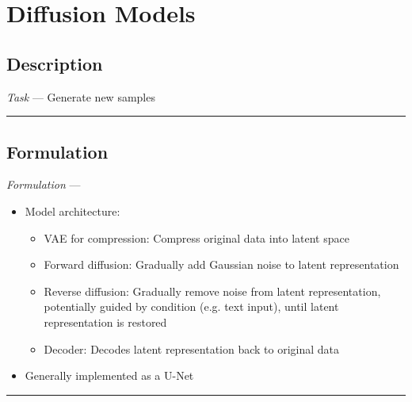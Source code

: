 \section{Diffusion Models}
\subsection*{Description}
\emph{Task} --- Generate new samples

{\color{black}\hrule height 0.001mm}

\subsection*{Formulation}
\emph{Formulation} --- 
\begin{itemize}
    \item Model architecture: 
    \begin{itemize}
        \item VAE for compression: Compress original data into latent space
        \item Forward diffusion: Gradually add Gaussian noise to latent representation
        \item Reverse diffusion: Gradually remove noise from latent representation, potentially guided by condition (e.g. text input), until latent representation is restored
        \item Decoder: Decodes latent representation back to original data
    \end{itemize}
    \item Generally implemented as a U-Net
\end{itemize}

{\color{black}\hrule height 0.001mm}

